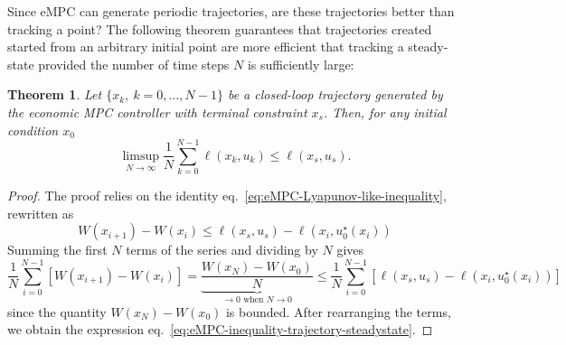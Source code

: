 \documentclass[11pt]{report}
\newtheorem{theorem}{Theorem}
\begin{document}
Since eMPC can generate periodic trajectories, are these trajectories better than tracking a point? The following theorem guarantees that trajectories created started from an arbitrary initial point are more efficient that tracking a steady-state provided the number of time steps $N$ is sufficiently large:
\begin{theorem}
  Let $\{x_k,\ k=0,\ldots,N-1\}$ be a closed-loop trajectory generated by the economic MPC controller with terminal constraint $x_s$. Then, for any initial condition $x_0$
  \begin{equation}
    \label{eq:eMPC-inequality-trajectory-steadystate}
    \limsup_{N\rightarrow \infty} \frac{1}{N} \sum_{k=0}^{N-1} \ell(x_k,u_k) \le \ell(x_s,u_s).
  \end{equation}
\end{theorem}
\begin{proof}
  The proof relies on the identity eq.~\eqref{eq:eMPC-Lyapunov-like-inequality}, rewritten as
  \begin{equation*}
    W(x_{i+1}) - W(x_i) \le \ell(x_s,u_s) - \ell(x_i,u_0^\star(x_i))
  \end{equation*}
  Summing the first $N$ terms of the series and dividing by $N$ gives
  \begin{equation*}
    \frac{1}{N}\sum_{i=0}^{N-1} \left[W(x_{i+1}) - W(x_i)\right] = \underbrace{\frac{W(x_N) - W(x_0)}{N}}_{\rightarrow 0 \text{ when } N\rightarrow 0} \le \frac{1}{N}\sum_{i=0}^{N-1}  \left[\ell(x_s,u_s) - \ell(x_i,u_0^\star(x_i))\right]
  \end{equation*}
  since the quantity $W(x_N) - W(x_0)$ is bounded. After rearranging the terms, we obtain the expression eq.~\eqref{eq:eMPC-inequality-trajectory-steadystate}.
\end{proof}




\end{document}
